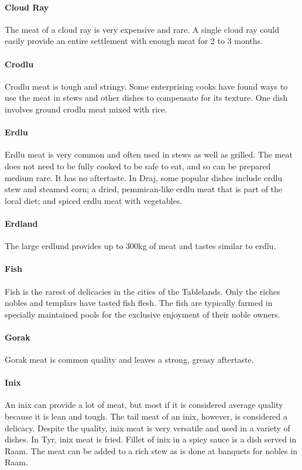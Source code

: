 \begin{multicols}{2}
\paragraph{Cloud Ray} The meat of a cloud ray is very expensive and rare. A single cloud ray could easily provide an entire settlement with enough meat for 2 to 3 months.\\
\paragraph{Crodlu} Crodlu meat is tough and stringy. Some enterprising cooks have found ways to use the meat in stews and other dishes to compensate for its texture. One dish involves ground crodlu meat mixed with rice.\\
\paragraph{Erdlu} Erdlu meat is very common and often used in stews as well as grilled. The meat does not need to be fully cooked to be safe to eat, and so can be prepared medium rare. It has no aftertaste. In Draj, some popular dishes include erdlu stew and steamed corn; a dried, pemmican-like erdlu meat that is part of the local diet; and spiced erdlu meat with vegetables.\\
\paragraph{Erdland} The large erdlund provides up to 300kg of meat and tastes similar to erdlu.\\
\paragraph{Fish} Fish is the rarest of delicacies in the cities of the Tablelands. Only the riches nobles and templars have tasted fish flesh. The fish are typically farmed in specially maintained pools for the exclusive enjoyment of their noble owners.\\
\paragraph{Gorak} Gorak meat is common quality and leaves a strong, greasy aftertaste.\\
\paragraph{Inix} An inix can provide a lot of meat, but most if it is considered average quality because it is lean and tough. The tail meat of an inix, however, is considered a delicacy. Despite the quality, inix meat is very versatile and used in a variety of dishes. In Tyr, inix meat is fried. Fillet of inix in a spicy sauce is a dish served in Raam. The meat can be added to a rich stew as is done at banquets for nobles in Raam.\\

\end{multicols}
